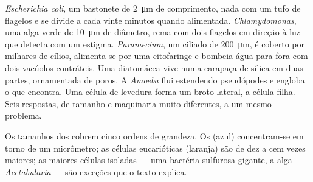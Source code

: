 \begin{example}\label{ex:b2:unicellular-diversity:drop}
\emph{Escherichia coli}, um bastonete de \qty{2}{\micro m} de
comprimento, nada com um tufo de flagelos e se divide a cada vinte
minutos quando alimentada. \emph{Chlamydomonas}, uma alga verde de
\qty{10}{\micro m} de diâmetro, rema com dois flagelos em direção à
luz que detecta com um estigma. \emph{Paramecium}, um ciliado de
\qty{200}{\micro m}, é coberto por milhares de cílios, alimenta-se por
uma citofaringe e bombeia água para fora com dois vacúolos
contráteis. Uma diatomácea vive numa carapaça de sílica em duas
partes, ornamentada de poros. A \emph{Amoeba} flui estendendo
pseudópodes e engloba o que encontra. Uma célula de levedura forma um
broto lateral, a célula-filha. Seis respostas, de tamanho e
maquinaria muito diferentes, a um mesmo problema.
\end{example}

\begin{omfigure}

{\small Os tamanhos dos  cobrem cinco ordens de
grandeza. Os  (azul) concentram-se em torno de um
micrômetro; as células eucarióticas (laranja) são de dez a cem vezes
maiores; as maiores células isoladas --- uma bactéria sulfurosa
gigante, a alga \emph{Acetabularia} --- são exceções que o texto
explica.}
\end{omfigure}

